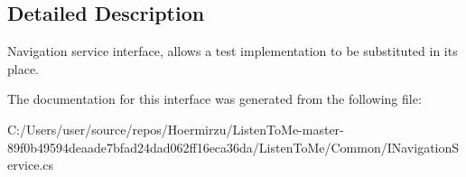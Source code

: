 \subsection{Detailed Description}
Navigation service interface, allows a test implementation to be substituted in its place. 



The documentation for this interface was generated from the following file\+:\begin{DoxyCompactItemize}
\item 
C\+:/\+Users/user/source/repos/\+Hoermirzu/\+Listen\+To\+Me-\/master-\/89f0b49594deaade7bfad24dad062ff16eca36da/\+Listen\+To\+Me/\+Common/I\+Navigation\+Service.\+cs\end{DoxyCompactItemize}

